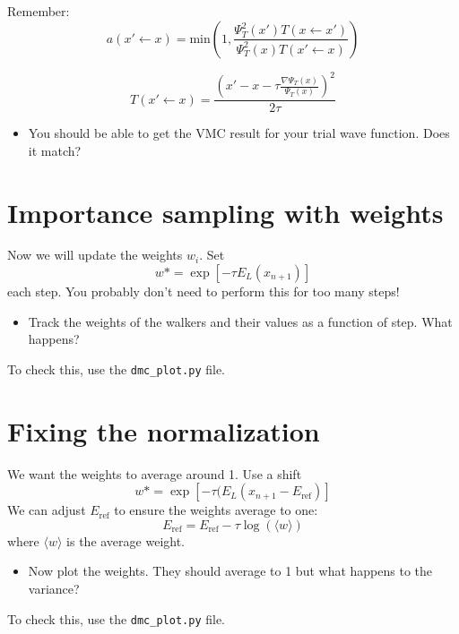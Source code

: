 \documentclass[12pt]{article}
\begin{document}
Remember:
\begin{equation}
	a(x' \leftarrow x) = \text{min}\left(1,\frac{\Psi_T^2(x') T(x \leftarrow x')}{\Psi_T^2(x) T(x' \leftarrow x)} \right)
\end{equation}

\begin{equation}
	T(x'\leftarrow x) = \frac{ \left(x' - x - \tau \frac{\nabla \Psi_T(x)}{\Psi_T(x)}\right)^2}{ 2\tau}
\end{equation}

\begin{itemize}
\item You should be able to get the VMC result for your trial wave function. Does it match? 
\end{itemize}

\section*{Importance sampling with weights}
Now we will update the weights $w_i$. Set 
\begin{equation}
w*=	\exp[-\tau E_L(x_{n+1})] 
\end{equation}
each step.
You probably don't need to perform this for too many steps!

\begin{itemize}
\item Track the weights of the walkers and their values as a function of step. What happens?
\end{itemize}
To check this, use the \texttt{dmc\_plot.py} file.


\section*{Fixing the normalization}

We want the weights to average around 1.
Use a shift 
\begin{equation}
w*=	\exp[-\tau (E_L(x_{n+1}-E_{\text{ref}})] 
\end{equation}
We can adjust $E_{\text {ref}}$ to ensure the weights average to one:
\begin{equation}
E_{\text{ref}}=E_{\text{ref}}-\tau \log(\langle w \rangle) 
\end{equation}
where $\langle w \rangle$ is the average weight. 

\begin{itemize}
\item Now plot the weights. They should average to 1 but what happens to the variance?
\end{itemize}
To check this, use the \texttt{dmc\_plot.py} file.
\end{document}
